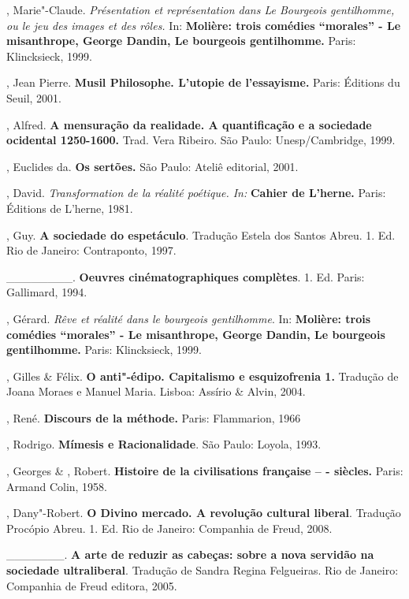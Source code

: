\begin{Parskip}
, Marie"-Claude. \emph{Présentation et représentation dans Le
Bourgeois gentilhomme, ou le jeu des images et des rôles.} In:
\textbf{Molière: trois comédies ``morales'' - Le misanthrope, George
Dandin, Le bourgeois gentilhomme.} Paris: Klincksieck, 1999.

, Jean Pierre. \textbf{Musil Philosophe. L'utopie de
l'essayisme.} Paris: Éditions du Seuil, 2001.

, Alfred. \textbf{A mensuração da realidade. A quantificação e a
sociedade ocidental 1250-1600.} Trad. Vera Ribeiro. São Paulo:
Unesp/Cambridge, 1999.

, Euclides da. \textbf{Os sertões.} São Paulo: Ateliê editorial,
2001.

, David. \emph{Transformation de la réalité poétique. In:}
\textbf{Cahier de L'herne.} Paris: Éditions de L'herne, 1981.

, Guy. \textbf{A sociedade do espetáculo}. Tradução Estela
dos Santos Abreu. 1. Ed. Rio de Janeiro: Contraponto, 1997.

\_\_\_\_\_\_\_\_. \textbf{Oeuvres cinématographiques complètes}.
1. Ed. Paris: Gallimard, 1994.

, Gérard. \emph{Rêve et réalité dans le bourgeois gentilhomme}.
In: \textbf{Molière: trois comédies ``morales'' - Le misanthrope, George
Dandin, Le bourgeois gentilhomme.} Paris: Klincksieck, 1999.

, Gilles \&  Félix. \textbf{O anti"-édipo. Capitalismo e
esquizofrenia 1.} Tradução de Joana Moraes e Manuel Maria. Lisboa:
Assírio \& Alvin, 2004.

, René. \textbf{Discours de la méthode.} Paris: Flammarion,
1966

, Rodrigo. \textbf{Mímesis e Racionalidade}. São Paulo: Loyola,
1993.

, Georges \& , Robert. \textbf{Histoire de la civilisations
française -- - siècles.} Paris: Armand Colin, 1958.

, Dany"-Robert. \textbf{O Divino mercado. A revolução cultural
liberal}. Tradução Procópio Abreu. 1. Ed. Rio de Janeiro:
Companhia de Freud, 2008.

\_\_\_\_\_\_\_. \textbf{A arte de reduzir as cabeças: sobre a nova
servidão na sociedade ultraliberal}. Tradução de Sandra Regina
Felgueiras. Rio de Janeiro: Companhia de Freud editora, 2005.


\end{Parskip}
